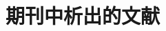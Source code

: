 \section{期刊中析出的文献}

\numerical

\nocite{yhs, lbm2, yx, cjj, desmarais, saito, walls, franz, park}


